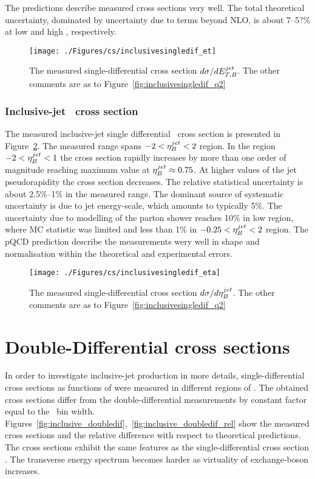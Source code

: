 The predictions describe measured cross sections very well. The total theoretical uncertainty, dominated by uncertainty due to terms beyond NLO, is about 7--5?\% at low and high \etjetb, respectively. 
\begin{figure}[p]
	\centering
		\texttt{[image: ./Figures/cs/inclusivesingledif\_et]}
	\caption{The measured single-differential cross section $d\sigma/d\mbox{$E_{T,B}^{jet}$}$. The other comments are as to Figure~\ref{fig:inclusivesingledif_q2}}
	\label{fig:inclusivesingledif_et}
\end{figure}

\subsubsection*{Inclusive-jet \dsdetajetb~cross section}
The measured inclusive-jet single differential \dsdetajetb~cross section is presented in Figure~\ref{fig:inclusivesingledif_eta}. The measured range spans $-2 < \mbox{$\eta_B^{jet}$} < 2$ region. In the region  $-2 < \mbox{$\eta_B^{jet}$} < 1$ the cross section rapidly increases by more than one order of magnitude reaching maximum value at $\mbox{$\eta_B^{jet}$} \approx 0.75$. At higher values of the jet pseudorapidity the cross section decreases. The relative statistical uncertainty is about 2.5\%--1\% in the measured range. The dominant source of systematic uncertainty is due to jet energy-scale, which amounts to typically 5\%. The uncertainty due to modelling of the parton shower reaches 10\% in low \etajetb region, where MC statistic was limited and less than 1\% in $-0.25 < \mbox{$\eta_B^{jet}$} < 2$ region. The pQCD prediction describe the measurements wery well in shape and normalisation within the theoretical and experimental errors.
\begin{figure}[p]
	\centering
		\texttt{[image: ./Figures/cs/inclusivesingledif\_eta]}
	\caption{The measured single-differential cross section $d\sigma/d\mbox{$\eta_B^{jet}$}$. The other comments are as to Figure~\ref{fig:inclusivesingledif_q2}}
	\label{fig:inclusivesingledif_eta}
\end{figure}

\section{Double-Differential cross sections}
In order to investigate inclusive-jet production in more details, single-differential cross sections as functions of \etjetb were measured in different regions of \qsq. The obtained cross sections differ from the double-differential measurements by constant factor equal to the \qsq~bin width. Figures~\ref{fig:inclusive_doubledif},~\ref{fig:inclusive_doubledif_rel} show the measured cross sections and the relative difference with respect to theoretical predictions. The cross sections exhibit the same features as the single-differential cross section \dsdetjetb. The transverse energy spectrum becomes harder as virtuality of exchange-boson increases.

